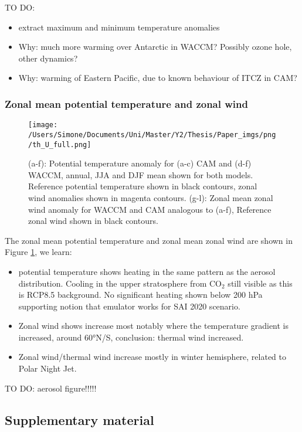 TO DO:
\begin{itemize}
	\item extract maximum and minimum temperature anomalies
	\item Why: much more warming over Antarctic in WACCM? Possibly ozone hole, other dynamics?
	\item Why: warming of Eastern Pacific, due to known behaviour of ITCZ in CAM?
\end{itemize}

\subsubsection{Zonal mean potential temperature and zonal wind}

\begin{figure}[H]
	\centering
	\texttt{[image: /Users/Simone/Documents/Uni/Master/Y2/Thesis/Paper\_imgs/png/th\_U\_full.png]}
	\caption{(a-f): Potential temperature anomaly for (a-c) CAM and (d-f) WACCM, annual, JJA and DJF mean shown for both models. Reference potential temperature shown in black contours, zonal wind anomalies shown in magenta contours. (g-l): Zonal mean zonal wind anomaly for WACCM and CAM analogous to (a-f), Reference zonal wind shown in black contours.}
	\label{fig:th_U}
\end{figure} 

The zonal mean potential temperature and zonal mean zonal wind are shown in Figure \ref{fig:th_U}, we learn:

\begin{itemize}
	\item potential temperature shows heating in the same pattern as the aerosol distribution. Cooling in the upper stratosphere from CO$_2$ still visible as this is RCP8.5 background. No significant heating shown below 200 hPa supporting notion that emulator works for SAI 2020 scenario. 
	\item Zonal wind shows increase most notably where the temperature gradient is increased, around 60°N/S, conclusion: thermal wind increased.
	\item Zonal wind/thermal wind increase mostly in winter hemisphere, related to Polar Night Jet. 
\end{itemize}

TO DO: aerosol figure!!!!!

\subsection{Supplementary material}

